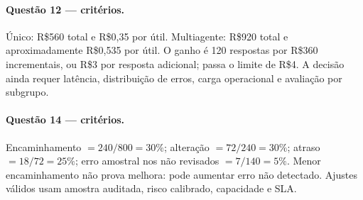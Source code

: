 \paragraph{Questão 12 — critérios.} Único: R\$560 total e R\$0,35 por útil. Multiagente: R\$920 total e aproximadamente R\$0,535 por útil. O ganho é 120 respostas por R\$360 incrementais, ou R\$3 por resposta adicional; passa o limite de R\$4. A decisão ainda requer latência, distribuição de erros, carga operacional e avaliação por subgrupo.

\paragraph{Questão 14 — critérios.} Encaminhamento $=240/800=30\%$; alteração $=72/240=30\%$; atraso $=18/72=25\%$; erro amostral nos não revisados $=7/140=5\%$. Menor encaminhamento não prova melhora: pode aumentar erro não detectado. Ajustes válidos usam amostra auditada, risco calibrado, capacidade e SLA.
